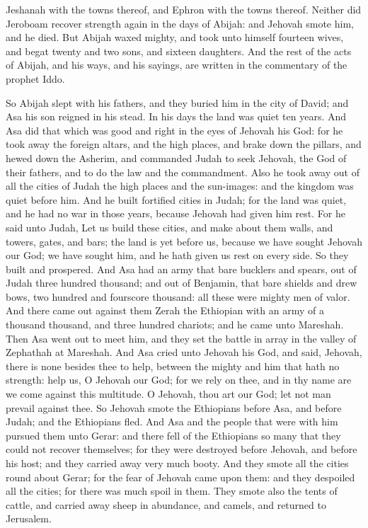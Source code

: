 Jeshanah with the towns thereof, and Ephron with the towns thereof. Neither did Jeroboam recover strength again in the days of Abijah: and Jehovah smote him, and he died. But Abijah waxed mighty, and took unto himself fourteen wives, and begat twenty and two sons, and sixteen daughters. And the rest of the acts of Abijah, and his ways, and his sayings, are written in the commentary of the prophet Iddo. 

So Abijah slept with his fathers, and they buried him in the city of David; and Asa his son reigned in his stead. In his days the land was quiet ten years. And Asa did that which was good and right in the eyes of Jehovah his God: for he took away the foreign altars, and the high places, and brake down the pillars, and hewed down the Asherim, and commanded Judah to seek Jehovah, the God of their fathers, and to do the law and the commandment. Also he took away out of all the cities of Judah the high places and the sun-images: and the kingdom was quiet before him. And he built fortified cities in Judah; for the land was quiet, and he had no war in those years, because Jehovah had given him rest. For he said unto Judah, Let us build these cities, and make about them walls, and towers, gates, and bars; the land is yet before us, because we have sought Jehovah our God; we have sought him, and he hath given us rest on every side. So they built and prospered. And Asa had an army that bare bucklers and spears, out of Judah three hundred thousand; and out of Benjamin, that bare shields and drew bows, two hundred and fourscore thousand: all these were mighty men of valor.  And there came out against them Zerah the Ethiopian with an army of a thousand thousand, and three hundred chariots; and he came unto Mareshah. Then Asa went out to meet him, and they set the battle in array in the valley of Zephathah at Mareshah. And Asa cried unto Jehovah his God, and said, Jehovah, there is none besides thee to help, between the mighty and him that hath no strength: help us, O Jehovah our God; for we rely on thee, and in thy name are we come against this multitude. O Jehovah, thou art our God; let not man prevail against thee. So Jehovah smote the Ethiopians before Asa, and before Judah; and the Ethiopians fled. And Asa and the people that were with him pursued them unto Gerar: and there fell of the Ethiopians so many that they could not recover themselves; for they were destroyed before Jehovah, and before his host; and they carried away very much booty. And they smote all the cities round about Gerar; for the fear of Jehovah came upon them: and they despoiled all the cities; for there was much spoil in them. They smote also the tents of cattle, and carried away sheep in abundance, and camels, and returned to Jerusalem. 

